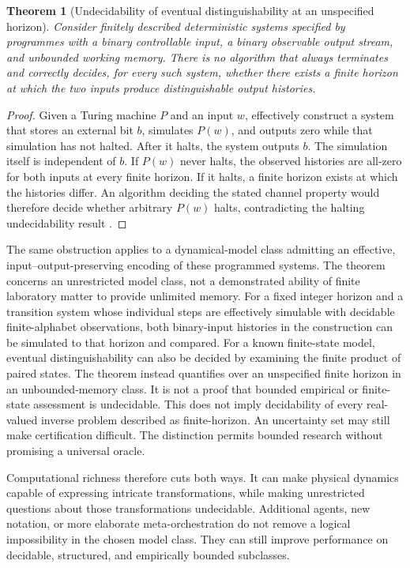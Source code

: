 \documentclass[11pt,a4paper]{article}
\newtheorem{theorem}{Theorem}[section]
\theoremstyle{definition}
\theoremstyle{remark}
\begin{document}
\begin{theorem}[Undecidability of eventual distinguishability at an unspecified horizon]\label{thm:undecidable}
Consider finitely described deterministic systems specified by programmes with a binary controllable input, a binary observable output stream, and unbounded working memory. There is no algorithm that always terminates and correctly decides, for every such system, whether there exists a finite horizon at which the two inputs produce distinguishable output histories.
\end{theorem}
\begin{proof}
Given a Turing machine $P$ and an input $w$, effectively construct a system that stores an external bit $b$, simulates $P(w)$, and outputs zero while that simulation has not halted. After it halts, the system outputs $b$. The simulation itself is independent of $b$. If $P(w)$ never halts, the observed histories are all-zero for both inputs at every finite horizon. If it halts, a finite horizon exists at which the histories differ. An algorithm deciding the stated channel property would therefore decide whether arbitrary $P(w)$ halts, contradicting the halting undecidability result \citep{turing}.
\end{proof}
The same obstruction applies to a dynamical-model class admitting an effective, input--output-preserving encoding of these programmed systems. The theorem concerns an unrestricted model class, not a demonstrated ability of finite laboratory matter to provide unlimited memory. For a fixed integer horizon and a transition system whose individual steps are effectively simulable with decidable finite-alphabet observations, both binary-input histories in the construction can be simulated to that horizon and compared. For a known finite-state model, eventual distinguishability can also be decided by examining the finite product of paired states. The theorem instead quantifies over an unspecified finite horizon in an unbounded-memory class. It is not a proof that bounded empirical or finite-state assessment is undecidable. This does not imply decidability of every real-valued inverse problem described as finite-horizon. An uncertainty set may still make certification difficult. The distinction permits bounded research without promising a universal oracle.

Computational richness therefore cuts both ways. It can make physical dynamics capable of expressing intricate transformations, while making unrestricted questions about those transformations undecidable. Additional agents, new notation, or more elaborate meta-orchestration do not remove a logical impossibility in the chosen model class. They can still improve performance on decidable, structured, and empirically bounded subclasses.
\end{document}
